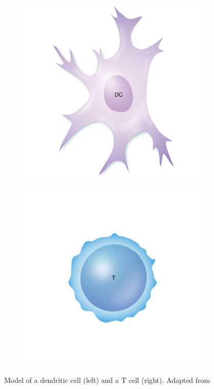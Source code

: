 \documentclass{l4proj}
\begin{document}
\begin{figure}[h]
    \centering
    \begin{subfigure}[h!]{0.3\textwidth}
        \includegraphics[width=\textwidth]{dissertation/figures/model_DC.png}
    \end{subfigure}
    \begin{subfigure}[h!]{0.3\textwidth}
        \includegraphics[width=\textwidth]{dissertation/figures/model_Tcell.png}
    \end{subfigure}
    \caption{Model of a dendritic cell (left) and a T cell (right). Adapted from \cite{https://www.immunology.org/public-information/bitesized-immunology/systems-and-processes/t-cell-activation}}
    \label{eval:graphs}
\end{figure}
\end{document}
